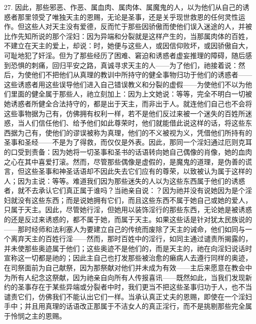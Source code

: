 27. 因此，那些邪恶、作恶、属血肉、属肉体、属魔鬼的人，以为他们从自己的诱惑者那里领受了唯独天主的恩赐，无论是圣事，还是关乎现世救恩的任何灵性运作。但这些人对天主没有爱德，反而忙于那些因骄傲而使他们误入迷途的人，并被比作先知所说的那个淫妇：因为异端和分裂就是这样产生的，当那属肉体的百姓，不建立在天主的爱上，却说：时，她便与这些人，或因信仰败坏，或因骄傲自大，可耻地犯了奸淫。但为了那些经历了困难、窘迫和诱惑者虚妄推理的障碍，随后感到恐惧的刺痛，回归平安之路，真诚寻求天主的人——为了他们，祂接着说：然后，为使他们不把他们从真理的教训中所持守的健全事物归功于他们的诱惑者——这些诱惑者用这些误导他们进入自己错误教义和分裂的虚假——为使他们不以为他们里面的健全属于那些人，祂立刻加上：因为上文她说：等等，完全不明白一切被她诱惑者所健全合法持守的，都是出于天主，而非出于人。就连他们自己也不会将这些事物据为己有，仿佛拥有权利一样，若不是他们反过来被一个迷失的百姓所迷惑，当人们信任他们、给予他们如此尊荣时，他们就能借此说这样的话，将这些东西据为己有，使他们的谬误被称为真理，他们的不义被视为义，凭借他们所持有的圣事和圣经——不是为了得救，而仅仅是外表。因此，那同一个淫妇通过厄则克耳的口受到责备：因为她将一切圣事和圣书的话语转向她自己偶像的肖像，她的血肉之心在其中喜爱打滚。然而，尽管那些偶像是虚假的，是魔鬼的道理，是伪善的谎言，但这些圣事和神圣话语却不因此失去它们应有的尊荣，以致被认为属于这样的人；因为主说：等等。难道我们因为那些迷失的人以为这些东西属于他们的诱惑者，就不去承认它们真正属于谁吗？当祂亲自说：？因为祂并没有说她因为是个淫妇就没有这些东西；而是说她拥有它们，而且这些东西不属于她自己或她的爱人，只属于天主。因此，尽管她行淫，但她用以装饰淫行的那些东西，无论她是被诱惑的还是反过来诱惑的，都不属于她，而属于天主。如果这些话是针对犹太民族说的——那时经师和法利塞人为要建立自己的传统而废除了天主的诫命，他们如同与一个离弃天主的百姓行淫——然而，那时百姓中的淫行，如同主通过谴责所揭露的，并未使那些奥迹属于他们；这些奥迹不是他们的，而是天主的，祂在向淫妇说话时宣称这一切都是祂的；因此主自己也打发那些被治愈的癞病人去遵行同样的奥迹，在司祭面前为自己献祭，因为那祭献对他们并未成为有效——主后来愿意在教会中为所有人纪念这祭献，因为祂亲自向所有人传报喜讯——既然如此，当我们发现新约的圣事存在于某些异端或分裂者中时，我们更当不把这些圣事归功于人，也不当谴责它们，仿佛我们不能认出它们一样。当承认真正丈夫的恩赐，即使在一个淫妇手中；并且用真理的话语改正那属于不洁女人的真正淫行，而不是挑剔那些完全属于怜悯之主的恩赐。\par

